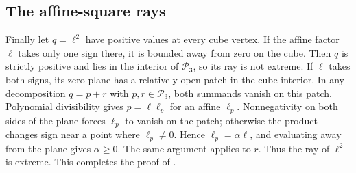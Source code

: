\subsection{The affine-square rays}

Finally let $q=\ell^2$ have positive values at every cube vertex. If the
affine factor $\ell$ takes only one sign there, it is bounded away from
zero on the cube. Then $q$ is strictly positive and lies in the interior
of $\mathcal P_3$, so its ray is not extreme. If $\ell$ takes both signs,
its zero plane has a relatively open patch in the cube interior.
In any decomposition $q=p+r$ with $p,r\in\mathcal P_3$, both summands
vanish on this patch. Polynomial divisibility gives $p=\ell\ell_p$ for
an affine $\ell_p$. Nonnegativity on both sides of the plane forces
$\ell_p$ to vanish on the patch; otherwise the product changes sign
near a point where $\ell_p\ne0$. Hence $\ell_p=\alpha\ell$, and
evaluating away from the plane gives $\alpha\ge0$. The same argument
applies to $r$. Thus the ray of $\ell^2$ is extreme. This completes
the proof of .
